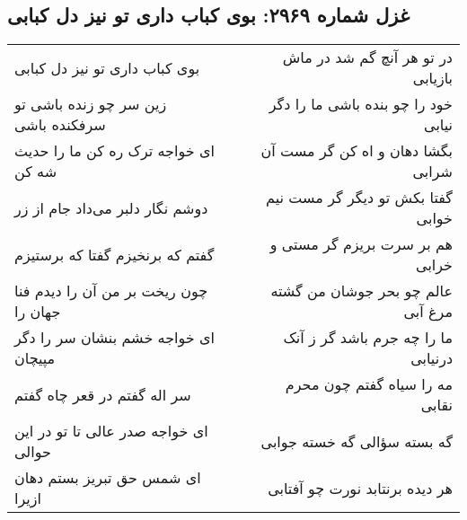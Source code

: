 \begin{center}
\section*{غزل شماره ۲۹۶۹: بوی کباب داری تو نیز دل کبابی}
\label{sec:2969}
\begin{longtable}{l p{0.5cm} r}
بوی کباب داری تو نیز دل کبابی
&&
در تو هر آنچ گم شد در ماش بازیابی
\\
زین سر چو زنده باشی تو سرفکنده باشی
&&
خود را چو بنده باشی ما را دگر نیابی
\\
ای خواجه ترک ره کن ما را حدیث شه کن
&&
بگشا دهان و اه کن گر مست آن شرابی
\\
دوشم نگار دلبر می‌داد جام از زر
&&
گفتا بکش تو دیگر گر مست نیم خوابی
\\
گفتم که برنخیزم گفتا که برستیزم
&&
هم بر سرت بریزم گر مستی و خرابی
\\
چون ریخت بر من آن را دیدم فنا جهان را
&&
عالم چو بحر جوشان من گشته مرغ آبی
\\
ای خواجه خشم بنشان سر را دگر مپیچان
&&
ما را چه جرم باشد گر ز آنک درنیابی
\\
سر اله گفتم در قعر چاه گفتم
&&
مه را سیاه گفتم چون محرم نقابی
\\
ای خواجه صدر عالی تا تو در این حوالی
&&
گه بسته سؤالی گه خسته جوابی
\\
ای شمس حق تبریز بستم دهان ازیرا
&&
هر دیده برنتابد نورت چو آفتابی
\\
\end{longtable}
\end{center}
